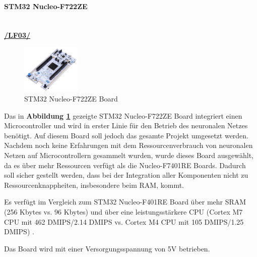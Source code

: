 


\paragraph{STM32 Nucleo-F722ZE}\label{sec:stm32-nucleo-f722ze}\mbox{}\\

\textbf{\hyperlink{lf-nn-01}{/LF03/}} \\

\begin{figure} %
	\vspace{-10pt}
	\hspace{20pt}
	\includegraphics[width=0.25\textwidth]{images/05_technische_spezifikation/nn/nucleo_f722ze.jpg}
	\caption{STM32 Nucleo-F722ZE Board}
	\label{fig:nucleo-f722ze}
\end{figure}


Das in \textbf{Abbildung \ref{fig:nucleo-f722ze}} gezeigte STM32 Nucleo-F722ZE Board integriert einen Microcontroller und wird in erster Linie für den Betrieb des neuronalen Netzes benötigt. Auf diesem Board soll jedoch das gesamte Projekt umgesetzt werden. Nachdem noch keine Erfahrungen mit dem Ressourcenverbrauch von neuronalen Netzen auf Microcontrollern gesammelt wurden, wurde dieses Board ausgewählt, da es über mehr Ressourcen verfügt als die Nucleo-F7401RE Boards. Dadurch soll sicher gestellt werden, dass bei der Integration aller Komponenten nicht zu Ressourcenknappheiten, insbesondere beim RAM, kommt.

Es verfügt im Vergleich zum STM32 Nucleo-F401RE Board über mehr SRAM (256 Kbytes vs. 96 Kbytes) und über eine leistungsstärkere CPU (Cortex M7 CPU mit 462 DMIPS/2.14 DMIPS vs. Cortex M4 CPU mit 105 DMIPS/1.25 DMIPS) \cite{stm32F7-board}. 

Das Board wird mit einer Versorgungsspannung von 5V betrieben. 